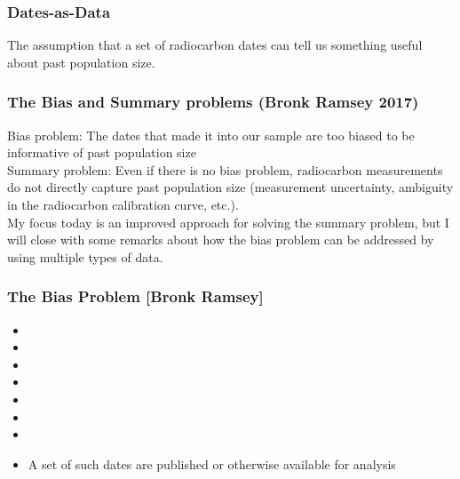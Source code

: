 \documentclass{beamer}
\begin{document}
\begin{frame}[t]
  \frametitle{Dates-as-Data}
  The assumption that a set of radiocarbon dates can tell us something useful about past population size.
\end{frame}

\begin{frame}[t]
  \frametitle{The Bias and Summary problems (Bronk Ramsey 2017)}
  Bias problem: The dates that made it into our sample are too biased to be informative of past population size\\
  \bigskip
  \pause
  Summary problem: Even if there is no bias problem, radiocarbon measurements do not directly capture past population size (measurement uncertainty, ambiguity in the radiocarbon calibration curve, etc.).\\
  \bigskip
  \pause
  My focus today is an improved approach for solving the summary problem, but I will close with some remarks about how the bias problem can be addressed by using multiple types of data.\\
\end{frame}

\begin{frame}[t]
  \frametitle{The Bias Problem [Bronk Ramsey]}
  \begin{itemize}
    \item
    \item
    \item
    \item
    \item
    \item
    \item
    \item A set of such dates are published or otherwise available for analysis
  \end{itemize}
\end{frame}
\end{document}
